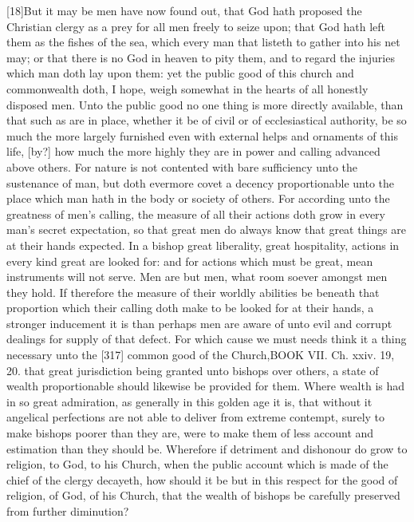 [18]But it may be men have now found out, that God hath proposed the Christian clergy as a prey for all men freely to seize upon; that God hath left them as the fishes of the sea, which every man that listeth to gather into his net may; or that there is no God in heaven to pity them, and to regard the injuries which man doth lay upon them: yet the public good of this church and commonwealth doth, I hope, weigh somewhat in the hearts of all honestly disposed men. Unto the public good no one thing is more directly available, than that such as are in place, whether it be of civil or of ecclesiastical authority, be so much the more largely furnished even with external helps and ornaments of this life, [by?] how much the more highly they are in power and calling advanced above others. For nature is not contented with bare sufficiency unto the sustenance of man, but doth evermore covet a decency proportionable unto the place which man hath in the body or society of others. For according unto the greatness of men’s calling, the measure of all their actions doth grow in every man’s secret expectation, so that great men do always know that great things are at their hands expected. In a bishop great liberality, great hospitality, actions in every kind great are looked for: and for actions which must be great, mean instruments will not serve. Men are but men, what room soever amongst men they hold. If therefore the measure of their worldly abilities be beneath that proportion which their calling doth make to be looked for at their hands, a stronger inducement it is than perhaps men are aware of unto evil and corrupt dealings for supply of that defect. For which cause we must needs think it a thing necessary unto the [317] common good of the Church,BOOK VII. Ch. xxiv. 19, 20. that great jurisdiction being granted unto bishops over others, a state of wealth proportionable should likewise be provided for them. Where wealth is had in so great admiration, as generally in this golden age it is, that without it angelical perfections are not able to deliver from extreme contempt, surely to make bishops poorer than they are, were to make them of less account and estimation than they should be. Wherefore if detriment and dishonour do grow to religion, to God, to his Church, when the public account which is made of the chief of the clergy decayeth, how should it be but in this respect for the good of religion, of God, of his Church, that the wealth of bishops be carefully preserved from further diminution?

